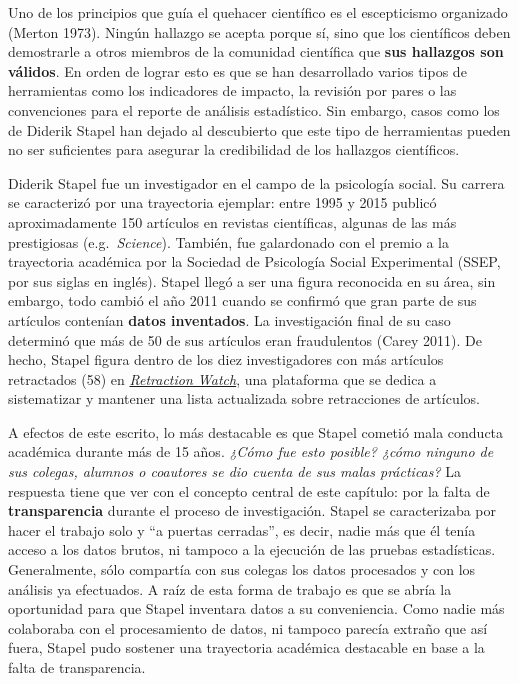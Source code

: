 \documentclass[
  spanish,
  letterpaper,
  DIV=11,
  numbers=noendperiod]{scrreprt}
\begin{document}
Uno de los principios que guía el quehacer científico es el escepticismo
organizado (Merton 1973). Ningún hallazgo se acepta porque sí, sino que
los científicos deben demostrarle a otros miembros de la comunidad
científica que \textbf{sus hallazgos son válidos}. En orden de lograr
esto es que se han desarrollado varios tipos de herramientas como los
indicadores de impacto, la revisión por pares o las convenciones para el
reporte de análisis estadístico. Sin embargo, casos como los de Diderik
Stapel han dejado al descubierto que este tipo de herramientas pueden no
ser suficientes para asegurar la credibilidad de los hallazgos
científicos.

Diderik Stapel fue un investigador en el campo de la psicología social.
Su carrera se caracterizó por una trayectoria ejemplar: entre 1995 y
2015 publicó aproximadamente 150 artículos en revistas científicas,
algunas de las más prestigiosas (e.g.~\emph{Science}). También, fue
galardonado con el premio a la trayectoria académica por la Sociedad de
Psicología Social Experimental (SSEP, por sus siglas en inglés). Stapel
llegó a ser una figura reconocida en su área, sin embargo, todo cambió
el año 2011 cuando se confirmó que gran parte de sus artículos contenían
\textbf{datos inventados}. La investigación final de su caso determinó
que más de 50 de sus artículos eran fraudulentos (Carey 2011). De hecho,
Stapel figura dentro de los diez investigadores con más artículos
retractados (58) en \href{https://retractionwatch.com/}{\emph{Retraction
Watch}}, una plataforma que se dedica a sistematizar y mantener una
lista actualizada sobre retracciones de artículos.

A efectos de este escrito, lo más destacable es que Stapel cometió mala
conducta académica durante más de 15 años. \emph{¿Cómo fue esto posible?
¿cómo ninguno de sus colegas, alumnos o coautores se dio cuenta de sus
malas prácticas?} La respuesta tiene que ver con el concepto central de
este capítulo: por la falta de \textbf{transparencia} durante el proceso
de investigación. Stapel se caracterizaba por hacer el trabajo solo y
``a puertas cerradas'', es decir, nadie más que él tenía acceso a los
datos brutos, ni tampoco a la ejecución de las pruebas estadísticas.
Generalmente, sólo compartía con sus colegas los datos procesados y con
los análisis ya efectuados. A raíz de esta forma de trabajo es que se
abría la oportunidad para que Stapel inventara datos a su conveniencia.
Como nadie más colaboraba con el procesamiento de datos, ni tampoco
parecía extraño que así fuera, Stapel pudo sostener una trayectoria
académica destacable en base a la falta de transparencia.
\end{document}
